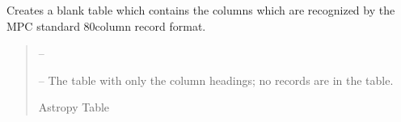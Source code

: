 \documentclass[letterpaper,11pt,english]{sphinxmanual}
\begin{document}
\begin{savenotes}\begin{fulllineitems}
\label{\detokenize{code/opihiexarata.library.mpcrecord:opihiexarata.library.mpcrecord.blank_minor_planet_table}}
\pysigstartsignatures
{}
\pysigstopsignatures
\sphinxAtStartPar
Creates a blank table which contains the columns which are recognized by
the MPC standard 80\sphinxhyphen{}column record format.
\begin{quote}\begin{description}
\sphinxAtStartPar
{} – 

\sphinxAtStartPar
{} – The table with only the column headings; no records are in the table.

\sphinxAtStartPar
Astropy Table

\end{description}\end{quote}

\end{fulllineitems}\end{savenotes}

\end{document}
